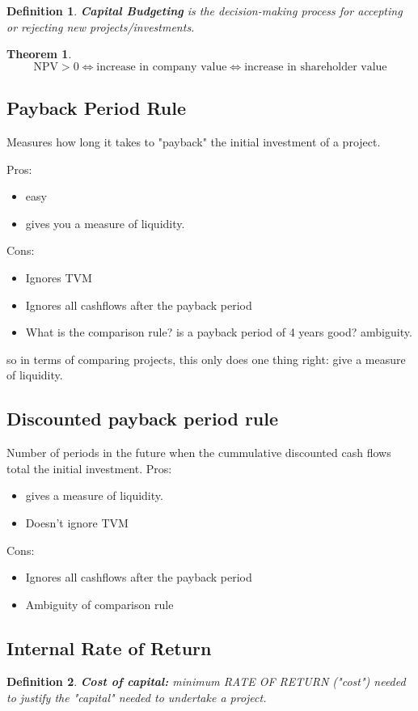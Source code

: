 \documentclass{article}
\newtheorem{definition}{Definition}
\newtheorem{theorem}{Theorem}
\begin{document}
\begin{definition}
\textbf{Capital Budgeting} is the decision-making process for accepting or rejecting new projects/investments.
\end{definition}

\begin{theorem}
\[ \text{NPV} > 0 \iff \text{increase in company value} \iff \text{increase in shareholder value}\]
\end{theorem}

\subsection{Payback Period Rule}
Measures how long it takes to "payback" the initial investment of a project.

Pros:
\begin{itemize}
\item easy
\item gives you a measure of liquidity. 
\end{itemize}

Cons:
\begin{itemize}
\item Ignores TVM
\item Ignores all cashflows after the payback period
\item What is the comparison rule? is a payback period of 4 years good? ambiguity.
\end{itemize}

so in terms of comparing projects, this only does one thing right: give a measure of liquidity. 
\subsection{Discounted payback period rule}
Number of periods in the future when the cummulative discounted cash flows total the initial investment. 
Pros:
\begin{itemize}
\item gives a measure of liquidity. 
\item Doesn't ignore TVM
\end{itemize}

Cons:
\begin{itemize}
\item Ignores all cashflows after the payback period
\item Ambiguity of comparison rule
\end{itemize}

\subsection{Internal Rate of Return}
\begin{definition}
\textbf{Cost of capital:} minimum RATE OF RETURN ("cost") needed to justify the "capital" needed to undertake a project.
\end{definition}
\end{document}
